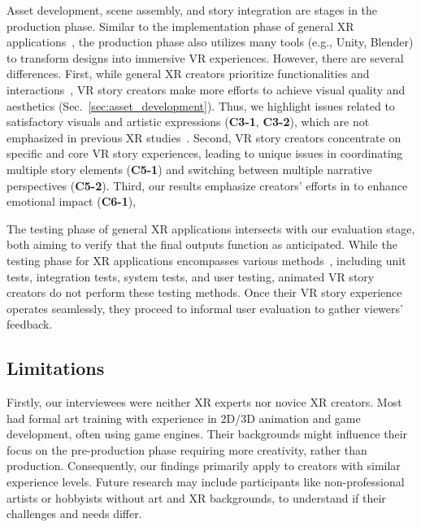 Asset development, scene assembly, and story integration are stages in the production phase. 
Similar to the implementation phase of general XR applications~\cite{krauss2021current}, the production phase also utilizes many tools (e.g., Unity, Blender) to transform designs into immersive VR experiences. 
However, there are several differences.
First, while general XR creators prioritize functionalities and interactions~\cite{ashtari2020creating, krauss2022elements}, VR story creators make more efforts to achieve visual quality and aesthetics (Sec.~\ref{sec:asset_development}). Thus, we highlight issues related to satisfactory visuals and artistic expressions (\textbf{C3-1}, \textbf{C3-2}), which are not emphasized in previous XR studies~\cite{ashtari2020creating, krauss2021current, krauss2022elements}. 
Second, VR story creators concentrate on specific and core VR story experiences, leading to unique issues in coordinating multiple story elements (\textbf{C5-1}) and switching between multiple narrative perspectives (\textbf{C5-2}).
Third, our results emphasize creators' efforts in  to enhance emotional impact (\textbf{C6-1}), 


The testing phase of general XR applications intersects with our evaluation stage, both aiming to verify that the final outputs function as anticipated. While the testing phase for XR applications encompasses various methods~\cite{liu2023challenges, borsting2022software}, including unit tests, integration tests, system tests, and user testing, animated VR story creators do not perform these testing methods. Once their VR story experience operates seamlessly, they proceed to informal user evaluation to gather viewers' feedback. 



\subsection{Limitations}

Firstly, our interviewees were neither XR experts nor novice XR creators. Most had formal art training with experience in 2D/3D animation and game development, often using game engines. Their backgrounds might influence their focus on the pre-production phase requiring more creativity, rather than production. Consequently, our findings primarily apply to creators with similar experience levels. Future research may include participants like non-professional artists or hobbyists without art and XR backgrounds, to understand if their challenges and needs differ.

